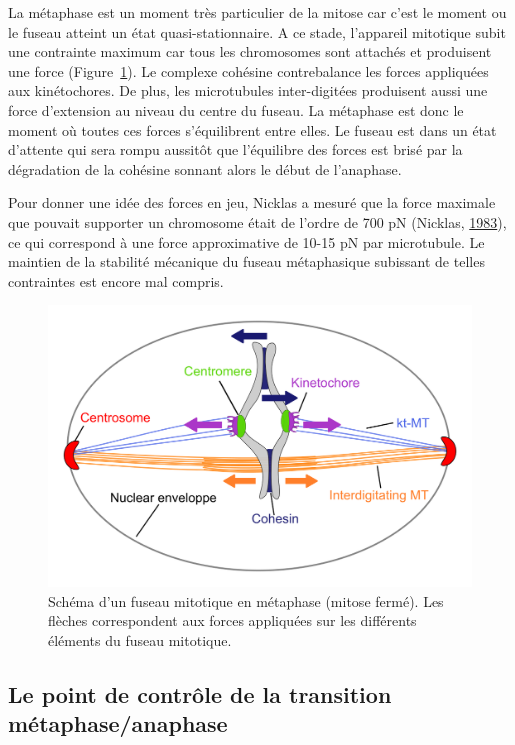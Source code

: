 \documentclass[12pt,a4paper,twoside,openright]{book}
\begin{document}
La métaphase est un moment très particulier de la mitose car c'est le
moment ou le fuseau atteint un état quasi-stationnaire. A ce stade,
l'appareil mitotique subit une contrainte maximum car tous les
chromosomes sont attachés et produisent une force
(Figure~\ref{fig:spindle}). Le complexe cohésine contrebalance les
forces appliquées aux kinétochores. De plus, les microtubules
inter-digitées produisent aussi une force d'extension au niveau du
centre du fuseau. La métaphase est donc le moment où toutes ces forces
s'équilibrent entre elles. Le fuseau est dans un état d'attente qui sera
rompu aussitôt que l'équilibre des forces est brisé par la dégradation
de la cohésine sonnant alors le début de l'anaphase.

Pour donner une idée des forces en jeu, Nicklas a mesuré que la force
maximale que pouvait supporter un chromosome était de l'ordre de 700 pN
(Nicklas, \protect\hyperlink{ref-Nicklas1983}{1983}), ce qui correspond
à une force approximative de 10-15 pN par microtubule. Le maintien de la
stabilité mécanique du fuseau métaphasique subissant de telles
contraintes est encore mal compris.

\begin{figure}[htbp]
\centering
\includegraphics{figures/intro/spindle.png}
\caption{\label{fig:spindle}Schéma d'un fuseau mitotique en métaphase
(mitose fermé). Les flèches correspondent aux forces appliquées sur les
différents éléments du fuseau mitotique.}
\end{figure}

\subsection{Le point de contrôle de la transition
métaphase/anaphase}\label{le-point-de-contruxf4le-de-la-transition-muxe9taphaseanaphase}
\end{document}
